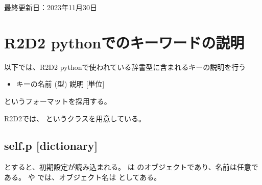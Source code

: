 \documentclass[letterpaper,10pt,dvipdfmx,report]{sphinxmanual}
\begin{document}
\sphinxAtStartPar
最終更新日：2023年11月30日

\sphinxstepscope


\chapter{R2D2 pythonでのキーワードの説明}
\label{\detokenize{notation:r2d2-python}}\label{\detokenize{notation::doc}}
\sphinxAtStartPar
以下では、R2D2 pythonで使われている辞書型に含まれるキーの説明を行う
\begin{itemize}
\item {} 
\sphinxAtStartPar
キーの名前 (型) \sphinxhyphen{}\sphinxhyphen{} 説明 {[}単位{]}

\end{itemize}

\sphinxAtStartPar
というフォーマットを採用する。

\sphinxAtStartPar
R2D2では、 というクラスを用意している。


\section{self.p {[}dictionary{]}}
\label{\detokenize{notation:self-p-dictionary}}
\begin{sphinxVerbatim}[commandchars=\\\{\}]
 
  
\end{sphinxVerbatim}

\sphinxAtStartPar
とすると、初期設定が読み込まれる。  は  のオブジェクトであり、名前は任意である。  や  では、オブジェクト名は  としてある。
\end{document}
